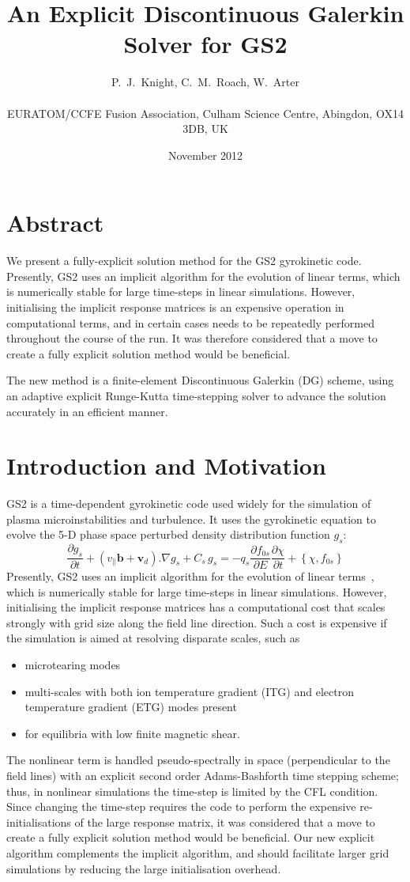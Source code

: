 \documentclass[10pt,a4paper]{article}
\title{An Explicit Discontinuous Galerkin Solver for GS2}
\author{P.\ J.\ Knight, C.\ M.\ Roach, W.\ Arter \\
~\\
\small EURATOM/CCFE Fusion Association, Culham Science Centre, Abingdon, OX14
3DB, UK}
\date{November 2012}
\begin{document}
\maketitle

\section*{Abstract}

We present a fully-explicit solution method for the GS2 gyrokinetic code.
Presently, GS2 uses an implicit algorithm for the evolution of linear terms,
which is numerically stable for large time-steps in linear simulations.
However, initialising the implicit response matrices is an expensive operation
in computational terms, and in certain cases needs to be repeatedly performed
throughout the course of the run. It was therefore considered that a move to
create a fully explicit solution method would be beneficial.

The new method is a finite-element Discontinuous Galerkin (DG) scheme, using
an adaptive explicit Runge-Kutta time-stepping solver to advance the solution
accurately in an efficient manner.

\section{Introduction and Motivation}

GS2 is a time-dependent gyrokinetic code used widely for the simulation of
plasma microinstabilities and turbulence. It uses the gyrokinetic equation to
evolve the 5-D phase space perturbed density distribution function $g_s$:
\[
\frac{\partial g_s}{\partial t} + (v_\parallel \mathbf{b} +
\mathbf{v}_d).\nabla g_s + C_s \, g_s = -q_s \frac{\partial f_{0s}}{\partial E}
\frac{\partial \chi}{\partial t} + \left\{ \chi, f_{0s} \right\}
\]
Presently, GS2 uses an implicit algorithm for the evolution of linear
terms~\cite{kotschenreuther}, which is numerically stable for large time-steps
in linear simulations. However, initialising the implicit response matrices
has a computational cost that scales strongly with grid size along the field
line direction. Such a cost is expensive if the simulation is aimed at
resolving disparate scales, such as
\begin{itemize}
\item microtearing modes
\item multi-scales with both ion temperature gradient (ITG) and electron
  temperature gradient (ETG) modes present
\item for equilibria with low finite magnetic shear.
\end{itemize}
The nonlinear term is handled pseudo-spectrally in space (perpendicular to the
field lines) with an explicit second order Adams-Bashforth time stepping
scheme; thus, in nonlinear simulations the time-step is limited by the CFL
condition. Since changing the time-step requires the code to perform the
expensive re-initialisations of the large response matrix, it was considered
that a move to create a fully explicit solution method would be beneficial.
Our new explicit algorithm complements the implicit algorithm, and should
facilitate larger grid simulations by reducing the large initialisation
overhead.
\end{document}
